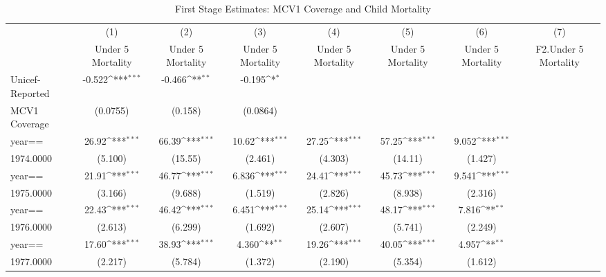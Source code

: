 \begin{table}[htbp]\centering
\def\sym#1{\ifmmode^{#1}\else\(^{#1}\)\fi}
\caption{First Stage Estimates: MCV1 Coverage and Child Mortality}
\begin{tabular}{l*{7}{c}}
\toprule
                &\multicolumn{1}{c}{(1)}&\multicolumn{1}{c}{(2)}&\multicolumn{1}{c}{(3)}&\multicolumn{1}{c}{(4)}&\multicolumn{1}{c}{(5)}&\multicolumn{1}{c}{(6)}&\multicolumn{1}{c}{(7)}\\
                &\multicolumn{1}{c}{Under 5 Mortality}&\multicolumn{1}{c}{Under 5 Mortality}&\multicolumn{1}{c}{Under 5 Mortality}&\multicolumn{1}{c}{Under 5 Mortality}&\multicolumn{1}{c}{Under 5 Mortality}&\multicolumn{1}{c}{Under 5 Mortality}&\multicolumn{1}{c}{F2.Under 5 Mortality}\\
\midrule
Unicef-Reported &   -0.522\sym{***}&   -0.466\sym{**} &   -0.195\sym{*}  &                  &                  &                  &                  \\
MCV1 Coverage   & (0.0755)         &  (0.158)         & (0.0864)         &                  &                  &                  &                  \\
year==          &    26.92\sym{***}&    66.39\sym{***}&    10.62\sym{***}&    27.25\sym{***}&    57.25\sym{***}&    9.052\sym{***}&                  \\
1974.0000       &  (5.100)         &  (15.55)         &  (2.461)         &  (4.303)         &  (14.11)         &  (1.427)         &                  \\
year==          &    21.91\sym{***}&    46.77\sym{***}&    6.836\sym{***}&    24.41\sym{***}&    45.73\sym{***}&    9.541\sym{***}&                  \\
1975.0000       &  (3.166)         &  (9.688)         &  (1.519)         &  (2.826)         &  (8.938)         &  (2.316)         &                  \\
year==          &    22.43\sym{***}&    46.42\sym{***}&    6.451\sym{***}&    25.14\sym{***}&    48.17\sym{***}&    7.816\sym{**} &                  \\
1976.0000       &  (2.613)         &  (6.299)         &  (1.692)         &  (2.607)         &  (5.741)         &  (2.249)         &                  \\
year==          &    17.60\sym{***}&    38.93\sym{***}&    4.360\sym{**} &    19.26\sym{***}&    40.05\sym{***}&    4.957\sym{**} &                  \\
1977.0000       &  (2.217)         &  (5.784)         &  (1.372)         &  (2.190)         &  (5.354)         &  (1.612)         &                  \\

\end{tabular}
\end{table}
